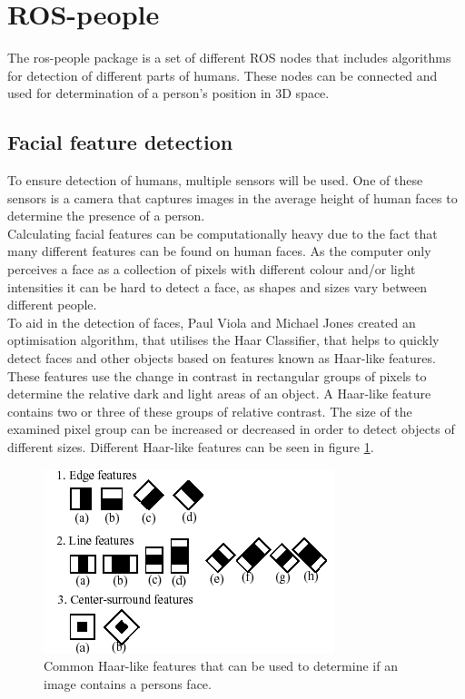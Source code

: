 \section{ROS-people}
The ros-people package is a set of different ROS nodes that includes algorithms for detection of different parts of humans. These nodes can be connected and used for determination of a person's position in 3D space.\\

\subsection{Facial feature detection} \label{sec:Face}%

To ensure detection of humans, multiple sensors will be used. One of these sensors is a camera that captures images in the average height of human faces to determine the presence of a person.\\

Calculating facial features can be computationally heavy due to the fact that many different features can be found on human faces. As the computer only perceives a face as a collection of pixels with different colour and/or light intensities it can be hard to detect a face, as shapes and sizes vary between different people.\\

To aid in the detection of faces, Paul Viola and Michael Jones created an optimisation algorithm, that utilises the Haar Classifier, that helps to quickly detect faces and other objects based on features known as Haar-like features\cite{Viola01robustreal-time}. These features use the change in contrast in rectangular groups of pixels to determine the relative dark and light areas of an object. A Haar-like feature contains two or three of these groups of relative contrast. The size of the examined pixel group can be increased or decreased in order to detect objects of different sizes. Different Haar-like features can be seen in figure \ref{fig:Haar-like}.

\begin{figure}[H]
    \centering
    \includegraphics[width=.6\textwidth]{figures/CommonHaarFeatures.png}
    \caption{Common Haar-like features that can be used to determine if an image contains a persons face.\cite{wilson2006facial}}
    \label{fig:Haar-like}
\end{figure}

